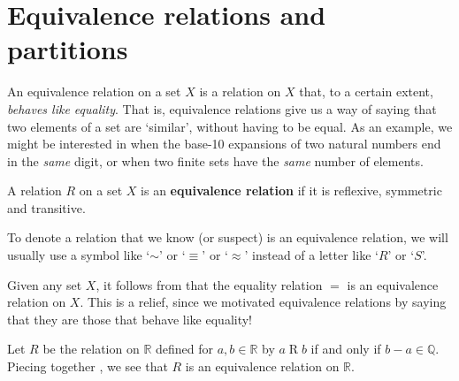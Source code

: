 \section{Equivalence relations and partitions}

An equivalence relation on a set $X$ is a relation on $X$ that, to a certain extent, \textit{behaves like equality}. That is, equivalence relations give us a way of saying that two elements of a set are `similar', without having to be equal. As an example, we might be interested in when the base-10 expansions of two natural numbers end in the \textit{same} digit, or when two finite sets have the \textit{same} number of elements.

\begin{definition}
\label{defEquivalenceRelation}
A relation $R$ on a set $X$ is an \textbf{equivalence relation} if it is reflexive, symmetric and transitive.
\end{definition}

To denote a relation that we know (or suspect) is an equivalence relation, we will usually use a symbol like `$\sim$'  or `$\equiv$'  or `$\approx$'  instead of a letter like `$R$' or `$S$'.

\begin{example}
\label{exEqualityIsEquivalenceRelation}
Given any set $X$, it follows from  that the equality relation $=$ is an equivalence relation on $X$. This is a relief, since we motivated equivalence relations by saying that they are those that behave like equality!
\end{example}

\begin{example}
\label{exDifferenceOfRealsInQIsEquivalenceRelation}
Let $R$ be the relation on $\mathbb{R}$ defined for $a,b \in \mathbb{R}$ by $a \mathrel{R} b$ if and only if $b-a \in \mathbb{Q}$. Piecing together , we see that $R$ is an equivalence relation on $\mathbb{R}$.
\end{example}

